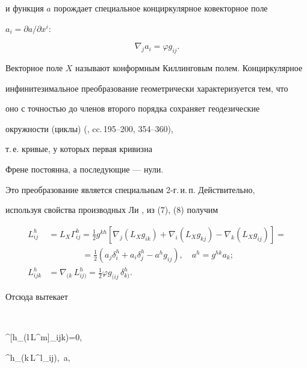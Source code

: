 и функция $a$ порождает специальное конциркулярное ковекторное поле


$a_i=\partial a/\partial x^i$:


\begin{equation}


\nabla_j a_i=\varphi g_{ij}.


\end{equation}


Векторное поле $X$ называют конформным Киллинговым полем. Конциркулярное


инфинитезимальное преобразование геометрически характеризуется тем, что


оно с точностью до членов второго порядка сохраняет геодезические


окружности (циклы) (\cite{7}, cc.\,195--200, 354--360),


т.\,е. кривые, у которых первая кривизна


Френе постоянна, а последующие --- нули.





Это преобразование является специальным 2-г.\,и.\,п. Действительно,


используя свойства производных Ли \cite{8}, из (7), (8) получим


\begin{equation}


\begin{split}


L^h_{ij}&=L_X\Gamma^h_{ij}=\frac{1}{2}g^{kh}[\nabla_j


(L_X g_{ik})+\nabla_i(L_X g_{kj})-


\nabla_k(L_X g_{ij})]= \\


&\qquad\qquad=\frac{1}{2}(a_j\delta^h_i


+a_i\delta^h_j-a^h g_{ij}),\quad a^h=g^{hk}a_k; \\


L^h_{ijk}&=\nabla_{(k}\,L^h_{ij)}=


\frac{1}{2}\varphi g_{(ij}\,\delta^h_{k)}.


\end{split}


\end{equation}


Отсюда вытекает


$$


\delta^{[h}_{(l}\,L^{m]}_{ijk)}=0,\quad


\delta^h_{(k}\,L^l_{ij)},\ \;\;a\ne\const,


